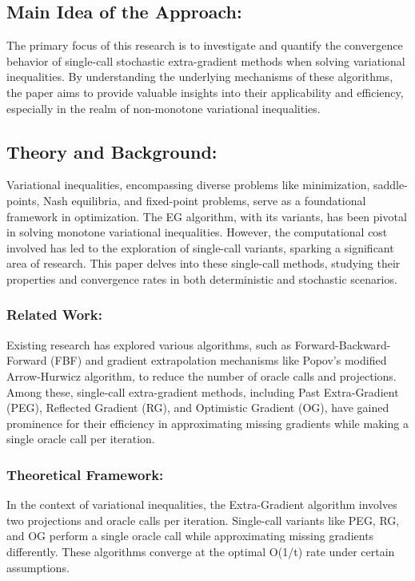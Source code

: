 \documentclass[11pt]{article}
\begin{document}
	\subsection{Main Idea of the Approach:}
        The primary focus of this research is to investigate and quantify the convergence behavior of single-call stochastic extra-gradient methods when solving variational inequalities. By understanding the underlying mechanisms of these algorithms, the paper aims to provide valuable insights into their applicability and efficiency, especially in the realm of non-monotone variational inequalities.
	
	\subsection{Theory and Background: }
 
        Variational inequalities, encompassing diverse problems like minimization, saddle-points, Nash equilibria, and fixed-point problems, serve as a foundational framework in optimization. The EG algorithm, with its variants, has been pivotal in solving monotone variational inequalities. However, the computational cost involved has led to the exploration of single-call variants, sparking a significant area of research. This paper delves into these single-call methods, studying their properties and convergence rates in both deterministic and stochastic scenarios.
	
		\subsubsection{Related Work: }
  
        Existing research has explored various algorithms, such as Forward-Backward-Forward (FBF) and gradient extrapolation mechanisms like Popov's modified Arrow-Hurwicz algorithm, to reduce the number of oracle calls and projections. Among these, single-call extra-gradient methods, including Past Extra-Gradient (PEG), Reflected Gradient (RG), and Optimistic Gradient (OG), have gained prominence for their efficiency in approximating missing gradients while making a single oracle call per iteration.
		
		\subsubsection{Theoretical Framework: }
  
        In the context of variational inequalities, the Extra-Gradient algorithm involves two projections and oracle calls per iteration. Single-call variants like PEG, RG, and OG perform a single oracle call while approximating missing gradients differently. These algorithms converge at the optimal O(1/t) rate under certain assumptions.
		
\end{document}
